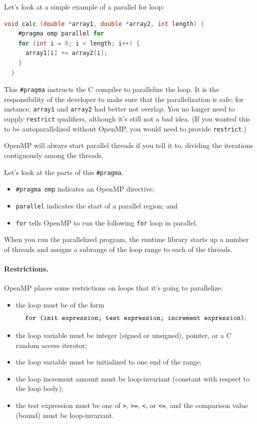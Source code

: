 \documentclass[a4paper]{report}
\newcommand{\CPP}{C\nolinebreak\hspace{-.05em}\raisebox{.4ex}{\tiny\bf +}\nolinebreak\hspace{-.10em}\raisebox{.4ex}{\tiny\bf +}}
\def\CPP{{C\nolinebreak[4]\hspace{-.05em}\raisebox{.4ex}{\tiny\bf ++}}}
\begin{document}
Let's look at a simple example of a parallel for loop:
{\small
\begin{lstlisting}[language=C,morekeywords={foreach,pragma,omp,parallel,single,nowait,task,untied,barrier,taskyield}]
  void calc (double *array1, double *array2, int length) {
    #pragma omp parallel for
    for (int i = 0; i < length; i++) {
      array1[i] += array2[i];
    }
  }
\end{lstlisting}
}
This \verb+#pragma+ instructs the C compiler to parallelize the
loop. It is the responsibility of the developer to make sure that
the parallelization is safe; for instance, {\tt array1} and {\tt array2}
had better not overlap. You no longer need to supply {\tt restrict}
qualifiers, although it's still not a bad idea. (If you wanted this
to be autoparallelized without OpenMP, you would need to provide
{\tt restrict}.)

OpenMP will always start parallel threads if you tell it to, dividing
the iterations contiguously among the threads.

Let's look at the parts of this \verb+#pragma+.
\begin{itemize}
\item \verb+#pragma omp+ indicates an OpenMP directive;
\item {\tt parallel} indicates the start of a parallel region; and
\item {\tt for} tells OpenMP to run the following {\tt for} loop in parallel.
\end{itemize}
When you run the parallelized program, the runtime library starts
up a number of threads and assigns a subrange of the loop range to 
each of the threads.

\paragraph{Restrictions.} OpenMP places some restrictions on
loops that it's going to parallelize:
\begin{itemize}
\item the loop must be of the form 
\[ \mbox{\tt for (init expression; test expression; increment expression)}; \]
\item the loop variable must be integer (signed or unsigned), pointer, or a \CPP~ 
random access iterator;
\item the loop variable must be initialized to one end of the range;
\item the loop increment amount must be loop-invariant (constant with respect to the loop body); 
\item the test expression must be one of {\tt >}, {\tt >=}, {\tt <}, or {\tt <=}, and the comparison value (bound) must be loop-invariant.
\end{itemize}
\end{document}

